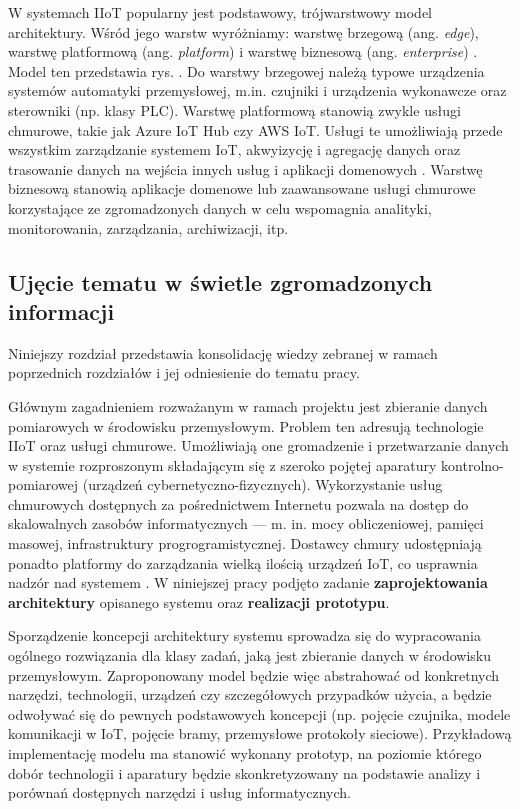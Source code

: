 \documentclass[a4paper, 12pt, twoside]{article}
\begin{document}
W systemach IIoT popularny jest podstawowy, trójwarstwowy model architektury. Wśród jego
warstw wyróżniamy: warstwę brzegową (ang. \emph{edge}), warstwę platformową (ang. \emph{platform})
i warstwę biznesową (ang. \emph{enterprise}) \cite{iiot-challenges-opportunities-directions}.
Model ten przedstawia rys. .
Do warstwy brzegowej należą
typowe urządzenia systemów automatyki przemysłowej, m.in. czujniki i urządzenia wykonawcze oraz
sterowniki (np. klasy PLC). Warstwę platformową stanowią zwykle usługi chmurowe,
takie jak Azure IoT Hub czy AWS IoT. Usługi te umożliwiają przede wszystkim zarządzanie
systemem IoT, akwyizycję i agregację danych oraz trasowanie danych na wejścia 
innych usług i aplikacji domenowych \cite{models-innovative-iot}. Warstwę biznesową
stanowią aplikacje domenowe lub zaawansowane usługi chmurowe
korzystające ze zgromadzonych danych w celu wspomagnia
analityki, monitorowania, zarządzania, archiwizacji, itp. 

\subsection{Ujęcie tematu w świetle zgromadzonych informacji}

Niniejszy rozdział przedstawia konsolidację wiedzy zebranej w ramach poprzednich
rozdziałów i jej odniesienie do tematu pracy. 

Głównym zagadnieniem rozważanym
w ramach projektu jest zbieranie danych pomiarowych w środowisku
przemysłowym. Problem ten adresują technologie IIoT oraz usługi chmurowe.
Umożliwiają one gromadzenie i przetwarzanie danych w systemie rozproszonym składającym
się z szeroko pojętej aparatury kontrolno-pomiarowej (urządzeń cybernetyczno-fizycznych).
Wykorzystanie usług chmurowych dostępnych za pośrednictwem Internetu
pozwala na dostęp do skalowalnych zasobów informatycznych --- m. in.
mocy obliczeniowej, pamięci masowej, infrastruktury progrogramistycznej. Dostawcy
chmury udostępniają ponadto platformy do zarządzania wielką ilością urządzeń IoT,
co usprawnia nadzór nad systemem \cite{iot-gateway-medical-and-industrial}. 
W niniejszej pracy podjęto zadanie \textbf{zaprojektowania architektury} opisanego systemu
oraz \textbf{realizacji prototypu}.

Sporządzenie koncepcji architektury systemu sprowadza się do wypracowania
ogólnego rozwiązania dla klasy zadań, jaką jest zbieranie danych w środowisku przemysłowym.
Zaproponowany model będzie więc abstrahować od konkretnych narzędzi, technologii,
urządzeń czy szczegółowych przypadków użycia, a będzie odwoływać się do pewnych 
podstawowych koncepcji (np. pojęcie czujnika, modele komunikacji w IoT, pojęcie bramy, przemysłowe protokoły sieciowe). 
Przykładową implementację modelu ma stanowić wykonany prototyp, na poziomie którego dobór technologii
i aparatury będzie skonkretyzowany na podstawie analizy i porównań dostępnych
narzędzi i usług informatycznych. 
\end{document}
